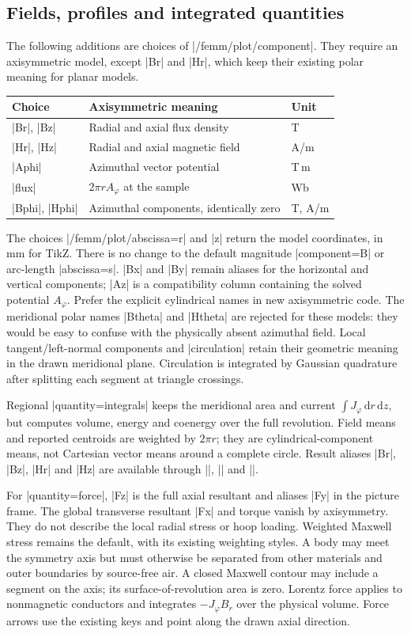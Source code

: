 \subsection{Fields, profiles and integrated quantities}
The following additions are choices of |/femm/plot/component|. They require an
axisymmetric model, except |Br| and |Hr|, which keep their existing polar meaning
for planar models.
\begin{center}
\begin{tabular}{lll}
\toprule Choice & Axisymmetric meaning & Unit\\
\midrule
|Br|, |Bz| & Radial and axial flux density & T\\
|Hr|, |Hz| & Radial and axial magnetic field & A/m\\
|Aphi| & Azimuthal vector potential & T\,m\\
|flux| & $2\pi rA_\varphi$ at the sample & Wb\\
|Bphi|, |Hphi| & Azimuthal components, identically zero & T, A/m\\
\bottomrule
\end{tabular}
\end{center}
The choices |/femm/plot/abscissa=r| and |z| return the model coordinates, in mm
for TikZ. There is no change to the default magnitude |component=B| or arc-length
|abscissa=s|. |Bx| and |By| remain aliases for the horizontal and vertical
components; |Az| is a compatibility column containing the solved potential
$A_\varphi$. Prefer the explicit cylindrical names in new axisymmetric code.
The meridional polar names |Btheta| and |Htheta| are rejected for these models:
they would be easy to confuse with the physically absent azimuthal field.
Local tangent/left-normal components and |circulation| retain their geometric
meaning in the drawn meridional plane. Circulation is integrated by Gaussian
quadrature after splitting each segment at triangle crossings.

Regional |quantity=integrals| keeps the meridional area and current
$\int J_\varphi\,\mathrm dr\,\mathrm dz$, but computes volume, energy and coenergy
over the full revolution. Field means and reported centroids are weighted by
$2\pi r$; they are cylindrical-component means, not Cartesian vector means
around a complete circle. Result aliases |Br|, |Bz|, |Hr| and |Hz| are available
through |\femmresult|, |\femmvalue| and |\femmresultplot|.

For |quantity=force|, |Fz| is the full axial resultant and aliases |Fy| in the
picture frame. The global transverse resultant |Fx| and torque vanish by
axisymmetry. They do not describe the local radial stress or hoop loading.
Weighted Maxwell stress remains the default, with its existing weighting styles.
A body may meet the symmetry axis but must otherwise be separated from other
materials and outer boundaries by source-free air. A closed Maxwell contour
may include a segment on the axis; its surface-of-revolution area is zero.
Lorentz force applies to nonmagnetic conductors and integrates
$-J_\varphi B_r$ over the physical volume. Force arrows use the existing keys
and point along the drawn axial direction.

